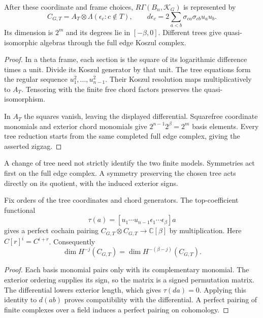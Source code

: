 \begin{theorem}\label{ei:thm:finite-model}
After these coordinate and frame choices,
$R\Gamma(B_n,\mathscr K_G)$ is represented by
\begin{equation}\label{ei:eq:finite-model}
 C_{G,T}=A_T\otimes\Lambda(\epsilon_c:c\notin T),\qquad
 d\epsilon_c=2\sum_{a<b}\sigma_{ca}\sigma_{cb}u_au_b.
\end{equation}
Its dimension is $2^m$ and its degrees lie in $[-\beta,0]$.
Different trees give quasi-isomorphic algebras through the full
edge Koszul complex.
\end{theorem}

\begin{proof}
In a theta frame, each section is the square of its logarithmic
difference times a unit. Divide its Koszul generator by that unit.
The tree equations form the regular sequence
$u_1^2,\ldots,u_{n-1}^2$.
Their Koszul resolution maps multiplicatively to $A_T$.
Tensoring with the finite free chord factors preserves the
quasi-isomorphism.

In $A_T$ the squares vanish, leaving the displayed differential.
Squarefree coordinate monomials and exterior chord monomials give
$2^{n-1}2^\beta=2^m$ basis elements.
Every tree reduction starts from the same completed full edge
complex, giving the asserted zigzag.
\end{proof}

A change of tree need not strictly identify the two finite models.
Symmetries act first on the full edge complex.
A symmetry preserving the chosen tree acts directly on its quotient,
with the induced exterior signs.

\begin{proposition}\label{ei:prop:trace}
Fix orders of the tree coordinates and chord generators.
The top-coefficient functional
\[
 \tau(a)=[u_1\cdots u_{n-1}\epsilon_1\cdots\epsilon_\beta]a
\]
gives a perfect cochain pairing
$C_{G,T}\otimes C_{G,T}\to\mathbb C[\beta]$ by multiplication.
Here $C[r]^i=C^{i+r}$. Consequently
\[
 \dim H^{-j}(C_{G,T})
  =\dim H^{-(\beta-j)}(C_{G,T}).
\]
\end{proposition}

\begin{proof}
Each basis monomial pairs only with its complementary monomial.
The exterior ordering supplies its sign, so the matrix is a signed
permutation matrix. The differential lowers exterior length,
which gives $\tau(da)=0$.
Applying this identity to $d(ab)$ proves compatibility with the
differential. A perfect pairing of finite complexes over a field
induces a perfect pairing on cohomology.
\end{proof}

